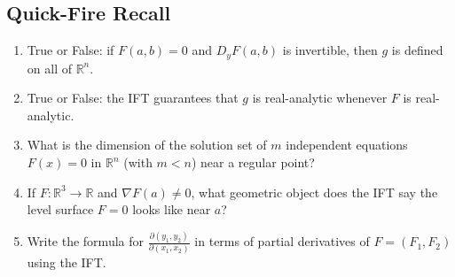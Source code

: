 \subsection{Quick-Fire Recall}

\begin{enumerate}[resume, leftmargin=*, label=\textbf{Q\arabic*.}]
  \item True or False: if $F(a,b) = 0$ and $D_y F(a,b)$ is invertible, then $g$ is defined on all of $\mathbb{R}^n$.
  \item True or False: the IFT guarantees that $g$ is real-analytic whenever $F$ is real-analytic.
  \item What is the dimension of the solution set of $m$ independent equations $F(x) = 0$ in $\mathbb{R}^n$ (with $m < n$) near a regular point?
  \item If $F : \mathbb{R}^3 \to \mathbb{R}$ and $\nabla F(a) \neq 0$, what geometric object does the IFT say the level surface $F = 0$ looks like near $a$?
  \item Write the formula for $\frac{\partial(y_1, y_2)}{\partial(x_1, x_2)}$ in terms of partial derivatives of $F = (F_1, F_2)$ using the IFT.
\end{enumerate}
